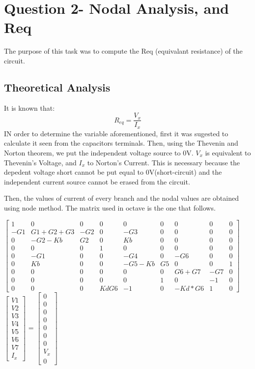 \section{Question 2- Nodal Analysis, and Req}
The purpose of this task was to compute the Req (equivalant resistance) of the circuit.

\subsection{Theoretical Analysis}
It is known that:
\begin{equation}
R_{eq}=\frac{V_{x}}{I_{x}}
\end{equation}
IN order to determine the variable aforementioned, first it was sugested to calculate it seen from the capacitors terminals. Then, using the Thevenin and Norton theorem, we put the independent voltage source to 0V. $V_{x}$ is equivalent to Thevenin's Voltage, and $I_{x}$ to Norton's Current. This is necessary because the depedent voltage short cannot be put equal to 0V(short-circuit) and the independent current source cannot be erased from the circuit.
\par
Then, the values of current of  every branch and the nodal values are obtained using node method. The matrix used in octave is the one that follows.

$\begin{bmatrix}
1 & 0 & 0 & 0 & 0 & 0 & 0 & 0 & 0\\
-G1 & G1+G2+G3 & -G2 & 0 & -G3 & 0 & 0 & 0 & 0\\
0 & -G2-Kb & G2 & 0 & Kb & 0 & 0 & 0 & 0\\
0 & 0 & 0 & 1 & 0 & 0 & 0 & 0 & 0\\
0 & -G1 & 0 & 0 & -G4 & 0 & -G6 & 0 & 0\\
0 & Kb & 0 & 0 & -G5-Kb & G5 & 0 & 0 & 1\\
0 & 0 & 0 & 0 & 0 & 0 & G6+G7& -G7 & 0\\
0 & 0 & 0 & 0 & 0 & 1 & 0 & -1 & 0\\
0 & 0 & 0 & KdG6 & -1 & 0 & -Kd*G6 & 1 & 0
\end{bmatrix}$
$\begin{bmatrix}
V1 \\ V2 \\ V3 \\ V4 \\ V5 \\ V6 \\ V7 \\ I_{x}
\end{bmatrix}$
= 
$\begin{bmatrix}
0 \\ 0 \\ 0 \\ 0 \\ 0 \\ 0 \\ 0 \\ V_{x} \\ 0
\end{bmatrix}$




